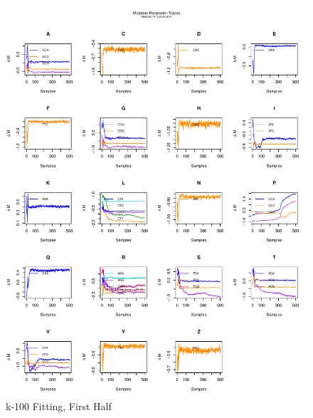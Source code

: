 \documentclass[11pt]{labbook}
\begin{document}
    \begin{figure}
        \centering
        \includegraphics[scale=.65]{FONSE_Plots/2016/December_14/k-100_mutation500}
        \caption{k-100 Fitting, First Half}
        \label{fig:k-100_1MUT}
    \end{figure}
\end{document}
